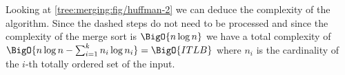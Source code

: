Looking at \ref{tree:merging:fig/huffman-2} we can deduce the complexity of the algorithm. Since the dashed steps do not need to be processed and since the complexity of the merge sort is $\BigO{n \log n}$ we have a total complexity of $\BigO{n \log n - \sum_{i=1}^{k} n_i \log n_i} = \BigO{ITLB}$ where $n_i$ is the cardinality of the $i$-th totally ordered set of the input.




